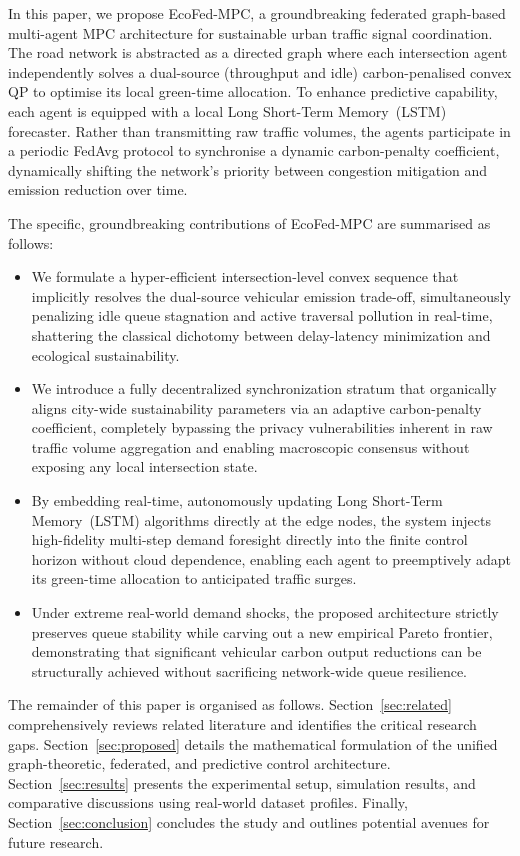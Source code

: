 \documentclass[journal]{IEEEtran}
\begin{document}
In this paper, we propose EcoFed-MPC, a groundbreaking federated graph-based multi-agent MPC architecture for sustainable urban traffic signal coordination. The road network is abstracted as a directed graph where each intersection agent independently solves a dual-source (throughput and idle) carbon-penalised convex QP to optimise its local green-time allocation. To enhance predictive capability, each agent is equipped with a local Long Short-Term Memory~(LSTM) forecaster. Rather than transmitting raw traffic volumes, the agents participate in a periodic FedAvg protocol to synchronise a dynamic carbon-penalty coefficient, dynamically shifting the network's priority between congestion mitigation and emission reduction over time.

The specific, groundbreaking contributions of EcoFed-MPC are summarised as follows:
\begin{itemize}
    \item We formulate a hyper-efficient intersection-level convex sequence that implicitly resolves the dual-source vehicular emission trade-off, simultaneously penalizing idle queue stagnation and active traversal pollution in real-time, shattering the classical dichotomy between delay-latency minimization and ecological sustainability.
    \item We introduce a fully decentralized synchronization stratum that organically aligns city-wide sustainability parameters via an adaptive carbon-penalty coefficient, completely bypassing the privacy vulnerabilities inherent in raw traffic volume aggregation and enabling macroscopic consensus without exposing any local intersection state.
    \item By embedding real-time, autonomously updating Long Short-Term Memory~(LSTM) algorithms directly at the edge nodes, the system injects high-fidelity multi-step demand foresight directly into the finite control horizon without cloud dependence, enabling each agent to preemptively adapt its green-time allocation to anticipated traffic surges.
    \item Under extreme real-world demand shocks, the proposed architecture strictly preserves queue stability while carving out a new empirical Pareto frontier, demonstrating that significant vehicular carbon output reductions can be structurally achieved without sacrificing network-wide queue resilience.
\end{itemize}

The remainder of this paper is organised as follows. Section~\ref{sec:related} comprehensively reviews related literature and identifies the critical research gaps. Section~\ref{sec:proposed} details the mathematical formulation of the unified graph-theoretic, federated, and predictive control architecture. Section~\ref{sec:results} presents the experimental setup, simulation results, and comparative discussions using real-world dataset profiles. Finally, Section~\ref{sec:conclusion} concludes the study and outlines potential avenues for future research.
\end{document}
